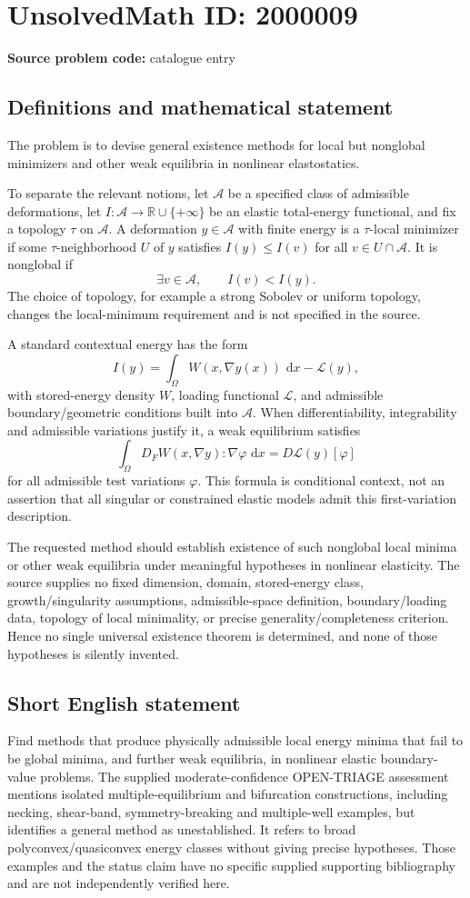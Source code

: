 \documentclass[11pt]{article}
\newcommand{\R}{\mathbb{R}}
\newcommand{\dd}{\,\mathrm{d}}
\begin{document}
\section*{UnsolvedMath ID: 2000009}
\textbf{Source problem code:} catalogue entry
\subsection{Definitions and mathematical statement}
The problem is to devise general existence methods for local but nonglobal minimizers and other weak equilibria in nonlinear elastostatics.

To separate the relevant notions, let $\mathcal A$ be a specified class of admissible deformations, let $I:\mathcal A\to\R\cup\{+\infty\}$ be an elastic total-energy functional, and fix a topology $\tau$ on $\mathcal A$. A deformation $y\in\mathcal A$ with finite energy is a $\tau$-local minimizer if some $\tau$-neighborhood $U$ of $y$ satisfies $I(y)\leq I(v)$ for all $v\in U\cap\mathcal A$. It is nonglobal if
\[
 \exists v\in\mathcal A,\qquad I(v)<I(y).
\]
The choice of topology, for example a strong Sobolev or uniform topology, changes the local-minimum requirement and is not specified in the source.

A standard contextual energy has the form
\[
 I(y)=\int_\Omega W(x,\nabla y(x))\,\dd x-\mathcal L(y),
\]
with stored-energy density $W$, loading functional $\mathcal L$, and admissible boundary/geometric conditions built into $\mathcal A$. When differentiability, integrability and admissible variations justify it, a weak equilibrium satisfies
\[
 \int_\Omega D_FW(x,\nabla y):\nabla\varphi\,\dd x
 =D\mathcal L(y)[\varphi]
\]
for all admissible test variations $\varphi$. This formula is conditional context, not an assertion that all singular or constrained elastic models admit this first-variation description.

The requested method should establish existence of such nonglobal local minima or other weak equilibria under meaningful hypotheses in nonlinear elasticity. The source supplies no fixed dimension, domain, stored-energy class, growth/singularity assumptions, admissible-space definition, boundary/loading data, topology of local minimality, or precise generality/completeness criterion. Hence no single universal existence theorem is determined, and none of those hypotheses is silently invented.
\subsection{Short English statement}
Find methods that produce physically admissible local energy minima that fail to be global minima, and further weak equilibria, in nonlinear elastic boundary-value problems. The supplied moderate-confidence OPEN-TRIAGE assessment mentions isolated multiple-equilibrium and bifurcation constructions, including necking, shear-band, symmetry-breaking and multiple-well examples, but identifies a general method as unestablished. It refers to broad polyconvex/quasiconvex energy classes without giving precise hypotheses. Those examples and the status claim have no specific supplied supporting bibliography and are not independently verified here.
\end{document}

